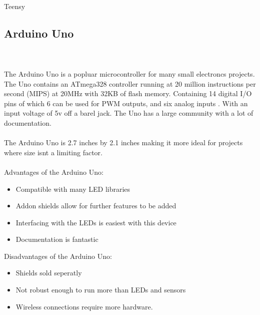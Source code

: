 Teensy\documentclass[onecolumn, draftclsnofoot,10pt, compsoc]{IEEEtran}
\begin{document}
		\subsection{Arduino Uno}
		\\\\
		The Arduino Uno is a popluar microcontroller for many small electroncs
		projects. The Uno contains an ATmega328 controller running at 20 million
		instructions per second (MIPS) at 20MHz with 32KB of flash
		memory\cite[Pg 2]{atmel}. Containing 14 digital I/O pins of which 6
		can be used for PWM outputs, and six analog inputs \cite[Pg 2]{arduino}. With
		an input voltage of 5v off a barel jack. The Uno has a large community with
		a lot of documentation.
		\\\\
		The Arduino Uno is 2.7 inches by 2.1 inches making it more ideal for
		projects where size isnt a limiting factor.
		\\\\Advantages of the Arduino Uno:
		\begin{itemize}
			\item Compatible with many LED libraries
			\item Addon shields allow for further features to be added
			\item Interfacing with the LEDs is easiest with this device
			\item Documentation is fantastic
		\end{itemize}
		Disadvantages of the Arduino Uno:
		\begin{itemize}
			\item Shields sold seperatly
			\item Not robust enough to run more than LEDs and sensors
			\item Wireless connections require more hardware.
		\end{itemize}
\end{document}
